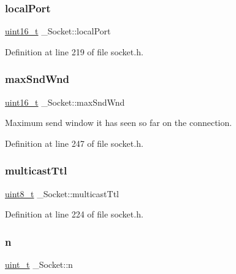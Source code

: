 \subsubsection{\texorpdfstring{local\+Port}{localPort}}
{\footnotesize\ttfamily \hyperlink{stdint_8h_a273cf69d639a59973b6019625df33e30}{uint16\+\_\+t} \+\_\+\+Socket\+::local\+Port}



Definition at line 219 of file socket.\+h.

\mbox{\label{struct__Socket_a04d1e4797f004268fe4aa0a88f2dc08a}} 
\subsubsection{\texorpdfstring{max\+Snd\+Wnd}{maxSndWnd}}
{\footnotesize\ttfamily \hyperlink{stdint_8h_a273cf69d639a59973b6019625df33e30}{uint16\+\_\+t} \+\_\+\+Socket\+::max\+Snd\+Wnd}



Maximum send window it has seen so far on the connection. 



Definition at line 247 of file socket.\+h.

\mbox{\label{struct__Socket_a69fe8dadf3142b75339e8f484b9059c0}} 
\subsubsection{\texorpdfstring{multicast\+Ttl}{multicastTtl}}
{\footnotesize\ttfamily \hyperlink{stdint_8h_aba7bc1797add20fe3efdf37ced1182c5}{uint8\+\_\+t} \+\_\+\+Socket\+::multicast\+Ttl}



Definition at line 224 of file socket.\+h.

\mbox{\label{struct__Socket_a1ead06c4cf339fa577569a36eba7b2f7}} 
\subsubsection{\texorpdfstring{n}{n}}
{\footnotesize\ttfamily \hyperlink{compiler__port_8h_a12a1e9b3ce141648783a82445d02b58d}{uint\+\_\+t} \+\_\+\+Socket\+::n}



